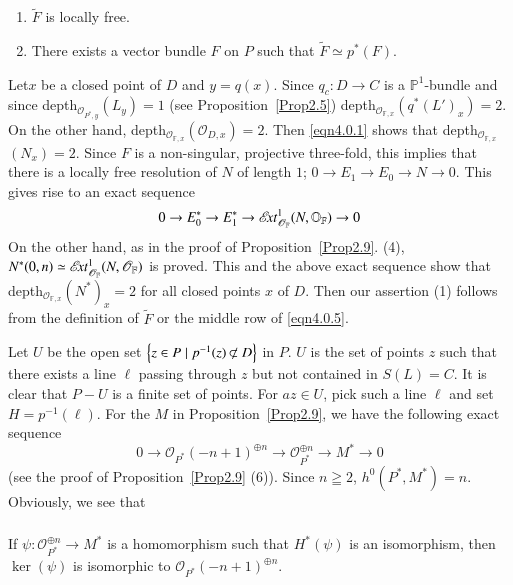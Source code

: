 \setcounter{dfn}{5}
\begin{Prop}\label{Prop4.6}
\begin{enumerate}
\renewcommand{\labelenumi}{(\theenumi)}
\item $\widetilde{F}$ is locally free.
\item There exists a vector bundle $F$ on $P$ such that
  $\widetilde{F}\simeq p^{\ast}(F)$.
\end{enumerate}
\end{Prop}

\begin{Proof}
Let\pageoriginale $x$ be a closed point of $D$ and $y=q(x)$. Since
$q_{c}:D\to C$ is a $\mathbb{P}^{1}$-bundle and since
depth$_{\mathscr{O}_{P^{\ast},y}}(L_y)=1$ (see
Proposition~\ref{Prop2.5})
depth$_{\mathscr{O}_{\mathbb{F},x}}(q^{\ast}(L')_x)=2$. On the other
hand, depth$_{\mathscr{O}_{\mathbb{F},x}}(\mathscr{O}_{D,x})=2$. Then
\eqref{eqn4.0.1} shows that depth$_{\mathscr{O}_{\mathbb{F},x}}$
$(N_x)=2$. Since $F$ is a non-singular,
projective three-fold, this implies that there is a locally free
resolution of $N$ of length $1$; $0\to E_1\to E_0\to N\to 0$. This gives
rise to an exact sequence 
$$
0\to E_0^{\ast}\to E_1^{\ast}\to
\mathscr{E}\!{\it xt}^{1}_{\mathscr{O}_{\mathbb{F}}}(N,\mathbb{O}_{\mathbb{F}})\to 0
$$
On the other hand, as in the proof of Proposition~\ref{Prop2.9}. (4),
$N^{\ast}(0,n)\simeq
\mathscr{E}\!{\it xt}^{1}_{\mathscr{O}_{\mathbb{F}}}(N,\mathscr{O}_{\mathbb{F}})$ is
proved. This and the above exact sequence show that
depth$_{\mathscr{O}_{\mathbb{F},x}}(N^{\ast})_x=2$ for all closed
points $x$ of $D$. Then our assertion (1) follows from the definition
of $\widetilde{F}$ or the middle row of \eqref{eqn4.0.5}.

Let $U$ be the open set $\left\{z\in P\mid p^{-1}(z)\not\kern-1pt\subset
D\right\}$ in $P$. $U$ is the set of points $z$ such that there exists
a line $\ell$ passing through $z$ but not contained in $S(L)=C$. It is
clear that $P -U$ is a finite set of points. For $a z\in U$, pick
such a line $\ell$ and set $H=p^{-1}(\ell)$. For the $M$ in
Proposition~\ref{Prop2.9}, we have the following exact sequence 
$$
0\to\mathscr{O}_{P^{\ast}}(-n+1)^{\oplus n}\to \mathscr{O}^{\oplus
  n}_{P^{\ast}}\to M^{\ast}\to 0
$$
(see the proof of Proposition~\ref{Prop2.9} (6)). Since $n\geqq 2$,
$h^{0}(P^{\ast}, M^{\ast})=n$. Obviously, we see that 

\setcounter{subsection}{6}
\setcounter{subsubsection}{0}
\subsubsection{}\label{eqn4.6.1}
If $\psi:\mathscr{O}_{P^{\ast}}^{\oplus n}\to M^{\ast}$
is a homomorphism such that 
$H^{\ast}(\psi)$\pageoriginale 
is an isomorphism, then $\ker(\psi)$ is isomorphic to
$\mathscr{O}_{P^{\ast}}(-n+1)^{\oplus n}$.


\end{Proof}
